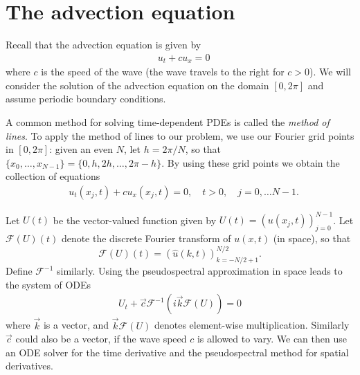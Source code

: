 \section*{The advection equation}
Recall that the advection equation is given by
\begin{align}
&{ }u_t + cu_x = 0
\end{align}
where $c$ is the speed of the wave (the wave travels to the right for $c > 0$).
We will consider the solution of the advection equation on the domain $[0,2\pi]$ and assume periodic boundary conditions.

A common method for solving time-dependent PDEs is called the \textit{method of lines}.
To apply the method of lines to our problem, we use our Fourier grid points in $[0,2\pi]$: given an even $N$, let $h = 2\pi/N$, so that $\{x_0,\ldots,x_{N-1}\} = \{0,h,2h,\ldots,2\pi-h\}$.
By using these grid points we obtain the collection of equations
\begin{align}
&{ }u_t(x_j,t) + cu_x(x_j,t) = 0, \quad t >0, \quad j = 0, \ldots N-1. \label{spectral2:method_oflines}
\end{align}

Let $U(t)$ be the vector-valued function given by $U(t) = (u(x_j,t))_{j=0}^{N-1}$.
Let $\mathcal{F}(U)(t)$ denote the discrete Fourier transform of $u(x,t)$ (in space), so that
\[
\mathcal{F}(U)(t) = (\hat{u}(k,t))_{k=-N/2+1}^{N/2}.
\]
Define $\mathcal{F}^{-1}$ similarly.
Using the pseudospectral approximation in space leads to the system of ODEs
\begin{align}
	U_t +  \vec{c}\mathcal{F}^{-1}\left(i\vec{k}\mathcal{F}(U) \right) = 0
\end{align}
where $\vec{k}$ is a vector, and $\vec{k}\mathcal{F}(U) $ denotes element-wise multiplication.
Similarly $\vec{c}$ could also be a vector, if the wave speed $c$ is allowed to vary. We can then use an ODE solver for the time derivative and the pseudospectral method for spatial derivatives.

